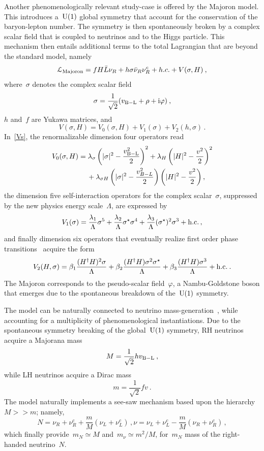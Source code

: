 \documentclass[reqno,11pt]{amsart}
\numberwithin{equation}{section}
\newcommand{\1}{\mbox{\rm 1 \hspace{-1.05 em} 1}}
\newcommand{\U}{{\rm{U}}}
\renewcommand{\imath}{\rm{i}}
\begin{document}
\begin{enumerate}[leftmargin=2em]
Another phenomenologically relevant study-case is offered by the Majoron mo\-del. This introduces a~$\U(1)$ global symmetry that account for the conservation of the baryon-lepton number. The symmetry is then spontaneously broken by a complex scalar field that is coupled to neutrinos and to the Higgs particle. This mechanism then entails additional terms to the total Lagrangian that are beyond the standard model, namely  
\[ \mathcal{L}_{\rm Majoron }= f H \bar{L} \nu_R + h \sigma \bar{\nu}_R \nu_R^c + h.c. + V(\sigma, H) \:, \]
where~$\sigma$ denotes the complex scalar field 
\[ \sigma=\frac{1}{\sqrt{2}}(v_{\rm B-L}+ \rho +\imath \varphi) \:, \]
$h$ and~$f$ are Yukawa matrices, and 
\begin{equation}\label{Vs}
V(\sigma, H)=V_0(\sigma, H)+V_1(\sigma)+V_2(h,\sigma)\,.
\end{equation}
In~\eqref{Vs}, the renormalizable dimension four operators read
\begin{align*}
V_0(\sigma, H) &= \lambda_{\sigma} \left( |\sigma|^2 -\frac{v_{\rm B-L}^2}{2} \right)^2  +  \lambda_H \left( |H|^2 -\frac{v^2}{2} \right)^2 \\ 
&\quad\:+ \lambda_{\sigma H}  \left( |\sigma|^2 -\frac{v_{B-L}^2}{2} \right) \left( |H|^2 -\frac{v^2}{2} \right) ,
\end{align*}
the dimension five self-interaction operators for the complex scalar~$\sigma$, suppressed by the new physics energy scale~$\Lambda$, are expressed by
\[ V_1(\sigma)= \frac{\lambda_1}{\Lambda} \sigma^5 +  \frac{\lambda_2}{\Lambda} \sigma^\star \sigma^4 +  \frac{\lambda_3}{\Lambda} (\sigma^\star)^2 \sigma^3 + {\rm h.c.}\,, \]
and finally dimension six operators that eventually realize first order phase transitions~\cite{Addazi:2017oge} acquire the form
\[ V_2(H,\sigma)= \beta_1 \frac{(H^\dagger H)^2\sigma}{\Lambda} +  \beta_2 \frac{(H^\dagger H)\sigma^2 \sigma^\star}{\Lambda} +  \beta_3 \frac{(H^\dagger H)\sigma^3 }{\Lambda} + {\rm h.c.}\:. \]
The Majoron corresponds to the pseudo-scalar field~$\varphi$, a Nambu-Goldstone boson that emerges due to the spontaneous breakdown of the~$\U(1)$ symmetry. 

The model can be naturally connected to neutrino mass-generation~\cite{Addazi:2019dqt}, while accounting for a multiplicity of phenomenological instantiations. Due to the spontaneous symmetry breaking of the global~$\U(1)$ symmetry, RH neutrinos acquire a Majorana mass 
\[ M= \frac{1}{\sqrt{2}} h v_{\rm B-L} \:, \]
while LH neutrinos acquire a Dirac mass
\[ m= \frac{1}{\sqrt{2}} f v \:. \]
The model naturally implements a see-saw mechanism based upon the hierarchy~$M\!>\!\!>\!m$; namely,
\[ N= \nu_R + \nu_R^c +\frac{m}{M} (\nu_L + \nu_L^c)\,,
\nu= \nu_L + \nu_L^c -\frac{m}{M} (\nu_R + \nu_R^c)\,, \]
which finally provide~$m_N\simeq M$ and~$m_\nu\simeq m^2/M$, for~$m_N$ mass of the right-handed neutrino~$N$. 


\end{enumerate}
\end{document}
